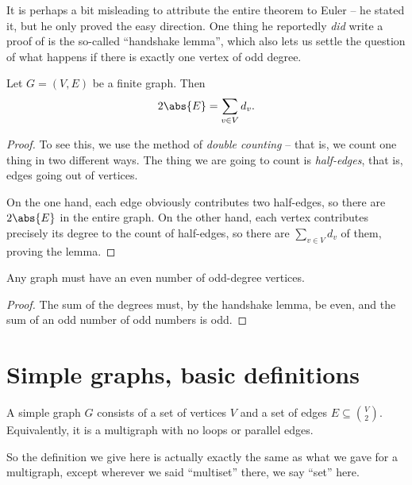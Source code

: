 \documentclass[nobib]{tufte-handout}
\begin{document}
It is perhaps a bit misleading to attribute the entire theorem to Euler -- he stated it, but he only proved the easy direction. One thing he reportedly \emph{did} write a proof of is the so-called ``handshake lemma'', which also lets us settle the question of what happens if there is exactly one vertex of odd degree.

\begin{lemma}
  Let $G = (V,E)$ be a finite graph. Then
    $$2\abs{E} = \sum_{v \in V} d_v.$$

  \begin{proof}
    To see this, we use the method of \emph{double counting} -- that is, we count one thing in two different ways. The thing we are going to count is \emph{half-edges}, that is, edges going out of vertices.

    On the one hand, each edge obviously contributes two half-edges, so there are $2\abs{E}$ in the entire graph. On the other hand, each vertex contributes precisely its degree to the count of half-edges, so there are $\sum_{v\in V} d_v$ of them, proving the lemma.
  \end{proof}
\end{lemma}

\begin{corollary}
  Any graph must have an even number of odd-degree vertices.
  \begin{proof}
    The sum of the degrees must, by the handshake lemma, be even, and the sum of an odd number of odd numbers is odd.
  \end{proof}
\end{corollary}

\section{Simple graphs, basic definitions}

\begin{definition}
  A simple graph $G$ consists of a set of vertices $V$ and a set of edges $E \subseteq \binom{V}{2}$. Equivalently, it is a multigraph with no loops or parallel edges.

  So the definition we give here is actually exactly the same as what we gave for a multigraph, except wherever we said ``multiset'' there, we say ``set'' here.
\end{definition}
\end{document}
